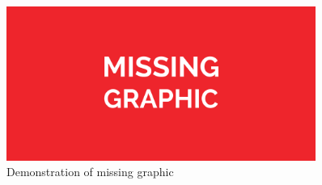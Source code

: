 \begin{figure}
    \centering
    \includegraphics[width=0.9\textwidth]{media/missing-graphic-rectangle.pdf}

    \caption{Demonstration of missing graphic}
    \label{missing-graphic-rectangle-example}
\end{figure}

